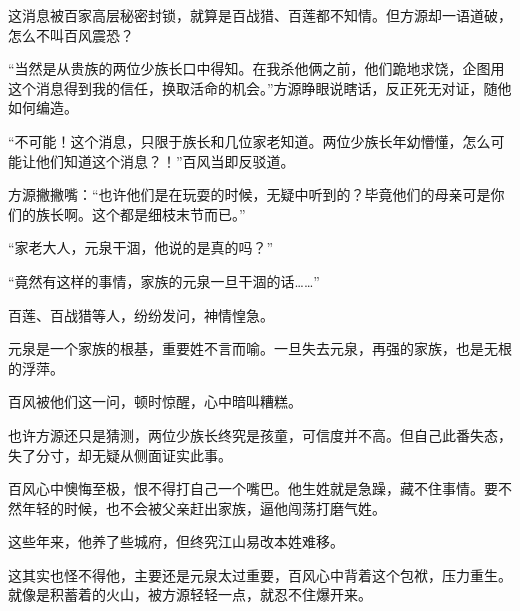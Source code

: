 \begin{this_body}
这消息被百家高层秘密封锁，就算是百战猎、百莲都不知情。但方源却一语道破，怎么不叫百风震恐？

“当然是从贵族的两位少族长口中得知。在我杀他俩之前，他们跪地求饶，企图用这个消息得到我的信任，换取活命的机会。”方源睁眼说瞎话，反正死无对证，随他如何编造。

“不可能！这个消息，只限于族长和几位家老知道。两位少族长年幼懵懂，怎么可能让他们知道这个消息？！”百风当即反驳道。

方源撇撇嘴：“也许他们是在玩耍的时候，无疑中听到的？毕竟他们的母亲可是你们的族长啊。这个都是细枝末节而已。”

“家老大人，元泉干涸，他说的是真的吗？”

“竟然有这样的事情，家族的元泉一旦干涸的话……”

百莲、百战猎等人，纷纷发问，神情惶急。

元泉是一个家族的根基，重要姓不言而喻。一旦失去元泉，再强的家族，也是无根的浮萍。

百风被他们这一问，顿时惊醒，心中暗叫糟糕。

也许方源还只是猜测，两位少族长终究是孩童，可信度并不高。但自己此番失态，失了分寸，却无疑从侧面证实此事。

百风心中懊悔至极，恨不得打自己一个嘴巴。他生姓就是急躁，藏不住事情。要不然年轻的时候，也不会被父亲赶出家族，逼他闯荡打磨气姓。

这些年来，他养了些城府，但终究江山易改本姓难移。

这其实也怪不得他，主要还是元泉太过重要，百风心中背着这个包袱，压力重生。就像是积蓄着的火山，被方源轻轻一点，就忍不住爆开来。

\end{this_body}

